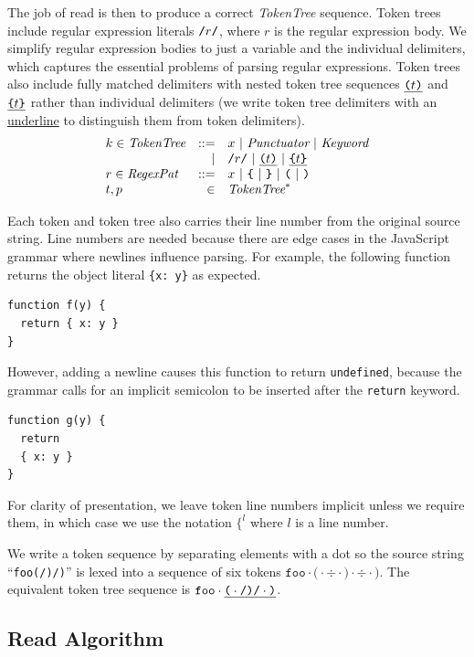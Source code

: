 \documentclass[9pt]{sigplanconf}
\begin{document}
The job of read is then to produce a correct \textit{TokenTree} sequence. Token trees include regular expression literals $\texttt{/}r\texttt{/}$, where $r$ is the regular expression body. We simplify regular expression bodies to just a variable and the individual delimiters, which captures the essential problems of parsing regular expressions.
Token trees also include fully matched delimiters with nested token tree sequences $\underline{ \texttt{(} t \texttt{)}}$ and $\underline{ \texttt{\{} t \texttt{\}} }$ rather than individual delimiters (we write token tree delimiters with an \underline{underline} to distinguish them from token delimiters).
\[
\begin{array}{lrl}
  k \in \textit{TokenTree} &::=& x ~|~ \textit{Punctuator} ~|~ \textit{Keyword}
  \\
  &|& \texttt{/}r\texttt{/} ~|~ \underline{ \texttt{(} t \texttt{)}} ~|~ \underline{ \texttt{\{} t \texttt{\}} }
  \\
  r \in \textit{RegexPat} &::=& x ~|~ \texttt{\{} ~|~ \texttt{\}}
  ~|~ \texttt{(} ~|~ \texttt{)}
  \\
  t,p &\in& \textit{TokenTree}^{*}
\end{array}
\]

Each token and token tree also carries their line number from the original source string. Line numbers are needed because there are edge cases in the JavaScript grammar 
where newlines influence parsing.
For example,
the following function returns the object literal \verb!{x: y}! as expected. 
\begin{lstlisting}
function f(y) {
  return { x: y }
}
\end{lstlisting}
However, adding a newline causes this function to 
return \verb!undefined!, because the grammar calls for an implicit semicolon to be inserted after the \verb!return! keyword.
\begin{lstlisting}
function g(y) {
  return 
  { x: y }
}
\end{lstlisting}
For clarity of presentation, we leave token line numbers implicit unless we require them, in which case we use the notation $\texttt{\{}^l$ where $l$ is a line number.

We write a token sequence by separating elements with a dot so
the source string ``\texttt{foo(/)/)}'' 
is lexed into a sequence
of six tokens \( \texttt{foo}\cdot \texttt{(} \cdot \div \cdot \texttt{)}
\cdot \div \cdot \texttt{)} \). The equivalent token tree sequence is
\(
\texttt{foo} \cdot \underline{ \texttt{(} \cdot \texttt{/} \texttt{)} \texttt{/} \cdot  \texttt{)}}
\).

\subsection{Read Algorithm}
\end{document}
